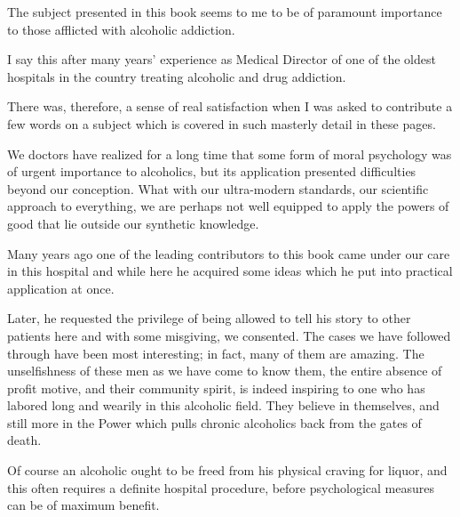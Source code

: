 \begin{biblechapter}
    The subject presented in this book seems to me 
    to be of paramount importance to those afflicted with alcoholic addiction.

\verse I say this after many years' experience as Medical Director 
    of one of the oldest hospitals in the country treating alcoholic and drug addiction.

\verse There was, therefore, a sense of real satisfaction when I was asked to contribute 
    a few words on a subject which is covered in such masterly detail in these pages.

\verse We doctors have realized for a long time that some form of moral psychology 
    was of urgent importance to alcoholics, 
    but its application presented difficulties beyond our conception. 
\verse What with our ultra-modern standards, our scientific approach to everything, 
    we are perhaps not well equipped to apply the powers of good that lie outside our synthetic knowledge.

\verse Many years ago one of the leading contributors to this book came under our care in this hospital 
    and while here he acquired some ideas which he put into practical application at once.

\verse Later, he requested the privilege of being allowed to tell his story to other patients here 
    and with some misgiving, we consented. 
\verse The cases we have followed through have been most interesting; 
    in fact, many of them are amazing. 
\verse The unselfishness of these men as we have come to know them, 
    the entire absence of profit motive, and their community spirit, 
    is indeed inspiring to one who has labored long and wearily in this alcoholic field. 
\verse They believe in themselves, 
    and still more in the Power which pulls chronic alcoholics back from the gates of death.

\verse Of course an alcoholic ought to be freed from his physical craving for liquor, 
    and this often requires a definite hospital procedure, 
    before psychological measures can be of maximum benefit.
\end{biblechapter}


